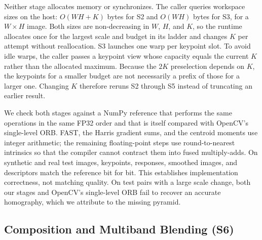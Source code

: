Neither stage allocates memory or synchronizes. The caller queries workspace
sizes on the host: $O(WH+K)$ bytes for S2 and $O(WH)$ bytes for S3, for a
$W\times H$ image. Both sizes are non-decreasing in $W$, $H$, and $K$, so the
runtime allocates once for the largest scale and budget in its ladder and
changes $K$ per attempt without reallocation. S3 launches one warp per keypoint
slot. To avoid idle warps, the caller passes a keypoint view whose capacity
equals the current $K$ rather than the allocated maximum. Because
the $2K$ preselection depends on $K$, the keypoints for a smaller budget are not
necessarily a prefix of those for a larger one. Changing $K$ therefore reruns
S2 through S5 instead of truncating an earlier result.

We check both stages against a NumPy reference that performs the same
operations in the same FP32 order and that is itself compared with OpenCV's
single-level ORB. FAST, the Harris gradient sums, and the centroid moments use
integer arithmetic; the remaining floating-point steps use round-to-nearest
intrinsics so that the compiler cannot contract them into fused multiply-adds.
On synthetic and real test images, keypoints, responses, smoothed images, and
descriptors match the reference bit for bit. This establishes implementation
correctness, not matching quality. On test pairs with a large scale change,
both our stages and OpenCV's single-level ORB fail to recover an accurate homography,
which we attribute to the missing pyramid.



\subsection{Composition and Multiband Blending (S6)}
\label{sec:s6}

